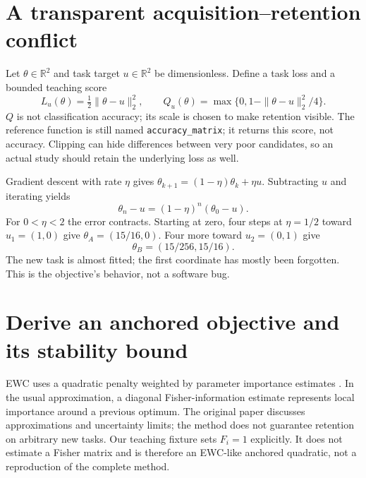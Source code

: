 \section{A transparent acquisition--retention conflict}
Let $\theta\in\mathbb R^2$ and task target $u\in\mathbb R^2$ be dimensionless.
Define a task loss and a bounded teaching score
\[
L_u(\theta)=\tfrac12\|\theta-u\|_2^2,
\qquad Q_u(\theta)=\max\{0,1-\|\theta-u\|_2^2/4\}.
\]
$Q$ is not classification accuracy; its scale is chosen to make retention
visible. The reference function is still named \texttt{accuracy\_matrix}; it
returns this score, not accuracy. Clipping can hide
differences between very poor candidates, so an actual study should retain
the underlying loss as well.

Gradient descent with rate $\eta$ gives
$\theta_{k+1}=(1-\eta)\theta_k+\eta u$.
Subtracting $u$ and iterating yields
\[
\theta_n-u=(1-\eta)^n(\theta_0-u).
\]
For $0<\eta<2$ the error contracts. Starting at zero, four steps at $\eta=1/2$
toward $u_1=(1,0)$ give $\theta_A=(15/16,0)$. Four more toward $u_2=(0,1)$ give
\[
\theta_B=(15/256,15/16).
\]
The new task is almost fitted; the first coordinate has mostly been forgotten.
This is the objective's behavior, not a software bug.


\section{Derive an anchored objective and its stability bound}
EWC uses a quadratic penalty weighted by parameter importance estimates
\cite{evod50:ewc}. In the usual approximation, a diagonal Fisher-information
estimate represents local importance around a previous optimum. The original
paper discusses approximations and uncertainty limits; the method does not
guarantee retention on arbitrary new tasks. Our teaching fixture sets
$F_i=1$ explicitly. It does not estimate a Fisher matrix and is therefore
an EWC-like anchored quadratic, not a reproduction of the complete method.

